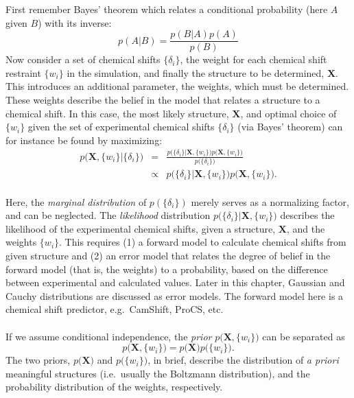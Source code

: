 First remember Bayes' theorem which relates a conditional probability (here $A$ given $B$) with its inverse:
\begin{equation}
p\left(A | B \right) =\frac{p\left(B | A \right)p\left(A\right)}{p\left(B \right)}
\end{equation}
Now consider a set of chemical shifts $\{\delta_i\}$, the weight for each chemical shift restraint $\{w_i\}$ in the simulation, and finally the structure to be determined, $\mathbf X$.
This introduces an additional parameter, the weights, which must be determined.
These weights describe the belief in the model that relates a structure to a chemical shift.
In this case, the most likely structure, $\mathbf X$, and optimal choice of $\{w_i\}$ given the set of experimental chemical shifts $\{\delta_i\}$ (via Bayes' theorem) can for instance be found by maximizing:
\begin{eqnarray}
    p\Big(\mathbf X, \{w_i\} \Big| \{\delta_i\} \Big) &=& \frac{p\Big( \{\delta_i\} \Big| \mathbf X, \{w_i\}\Big)p\Big(\mathbf X, \{w_i\} \Big)}{p\Big( \{\delta_i\}\Big)}\nonumber\\
 &\propto& p\Big( \{\delta_i\} \Big| \mathbf X, \{w_i\}\Big)p\Big (\mathbf X, \{w_i\} \Big).
\label{eq:bayes_likelihood}
\end{eqnarray}\\
Here, the \textit{marginal distribution} of $p\left( \{\delta_i\}\right)$ merely serves as a normalizing factor, and can be neglected.
The \textit{likelihood} distribution $p\Big( \{\delta_i\} \Big| \mathbf X, \{w_i\}\Big)$ describes the likelihood of the experimental chemical shifts, given a structure, $\mathbf X$, and the weights $\{w_i\}$.
This requires (1) a forward model to calculate chemical shifts from given structure and (2) an error model that relates the degree of belief in the forward model (that is, the weights) to a probability, based on the difference between experimental and calculated values. 
Later in this chapter, Gaussian and Cauchy distributions are discussed as error models.
The forward model here is a chemical shift predictor, e.g.~CamShift, ProCS, etc.
\\\\If we assume conditional independence, the \textit{prior} $p\Big (\mathbf X, \{w_i\} \Big)$ can be separated as
\begin{equation}
p\Big(\mathbf X, \{w_i\} \Big) = p\Big(\mathbf X\Big) p\Big(\{w_i\} \Big).
\end{equation}
The two priors, $p\Big(\mathbf X\Big)$ and $p\Big(\{w_i\} \Big)$, in brief, describe the distribution of \textit{a priori} meaningful structures (i.e.~usually the Boltzmann distribution), and the probability distribution of the weights, respectively.

